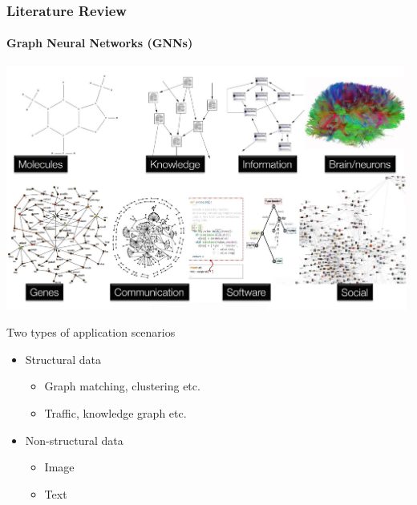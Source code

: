 \documentclass[light]{lutbeamer} %
\begin{document}
\begin{frame}
    \frametitle{Literature Review}
    \framesubtitle{Graph Neural Networks (GNNs)}

    \begin{minipage}[c]{0.65\textwidth}
        \includegraphics[width=\textwidth]{figures/what_is_GNNs.jpeg}
        \vspace{-0.5cm} %
    \end{minipage}
    \hfill
    \begin{minipage}[c]{0.3\textwidth}
        Two types of application scenarios \cite{zhou2020-graph}
        \begin{itemize}
            \item Structural data
                  \begin{itemize}
                      \item Graph matching, clustering etc.
                      \item Traffic, knowledge graph etc.
                  \end{itemize}
            \item Non-structural data
                  \begin{itemize}
                      \item Image
                      \item Text
                  \end{itemize}
        \end{itemize}
    \end{minipage}
\end{frame}
\end{document}
